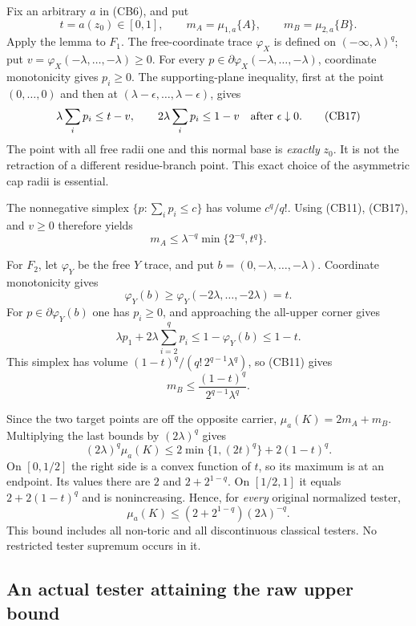 Fix an arbitrary $a$ in (CB6), and put
\[
           t=a(z_0)\in[0,1],\qquad
           m_A=\mu_{1,a}\{A\},\qquad m_B=\mu_{2,a}\{B\}.
 \tag{CB16}
\]
Apply the lemma to $F_1$. The free-coordinate trace
$\varphi_X$ is defined on $(-\infty,\lambda)^q$; put
$v=\varphi_X(-\lambda,\ldots,-\lambda)\ge0$.
For every $p\in\partial\varphi_X(-\lambda,\ldots,-\lambda)$,
coordinate monotonicity gives $p_i\ge0$. The supporting-plane
inequality, first at the point $(0,\ldots,0)$ and then at
$(\lambda-\epsilon,\ldots,\lambda-\epsilon)$, gives
\[
        \lambda\sum_i p_i\le t-v,\qquad
        2\lambda\sum_i p_i\le1-v
                        \quad\hbox{after }\epsilon\downarrow0.
 \tag{CB17}
\]
The point with all free radii one and this normal base is
\emph{exactly} $z_0$. It is not the retraction of a different
residue-branch point. This exact choice of the asymmetric cap
radii is essential.

The nonnegative simplex
$\{p:\sum_i p_i\le c\}$ has volume $c^q/q!$.
Using (CB11), (CB17), and $v\ge0$ therefore yields
\[
                  m_A\le
                 \lambda^{-q}\min\{2^{-q},t^q\}.
 \tag{CB18}
\]

For $F_2$, let $\varphi_Y$ be the free $Y$ trace, and put
$b=(0,-\lambda,\ldots,-\lambda)$.
Coordinate monotonicity gives
\[
       \varphi_Y(b)\ge
          \varphi_Y(-2\lambda,\ldots,-2\lambda)=t.
 \tag{CB19}
\]
For $p\in\partial\varphi_Y(b)$ one has $p_i\ge0$, and
approaching the all-upper corner gives
\[
       \lambda p_1+2\lambda\sum_{i=2}^q p_i
                           \le1-\varphi_Y(b)\le1-t.
 \tag{CB20}
\]
This simplex has volume
$(1-t)^q/(q!\,2^{q-1}\lambda^q)$, so (CB11) gives
\[
                    m_B\le
                    \frac{(1-t)^q}{2^{q-1}\lambda^q}.
 \tag{CB21}
\]

Since the two target points are off the opposite carrier,
$\mu_a(K)=2m_A+m_B$. Multiplying the last bounds by
$(2\lambda)^q$ gives
\[
       (2\lambda)^q\mu_a(K)
          \le2\min\{1,(2t)^q\}+2(1-t)^q.
 \tag{CB22}
\]
On $[0,1/2]$ the right side is a convex function of $t$,
so its maximum is at an endpoint. Its values there are
$2$ and $2+2^{1-q}$. On $[1/2,1]$ it equals
$2+2(1-t)^q$ and is nonincreasing. Hence, for
\emph{every} original normalized tester,
\[
                       \mu_a(K)\le
                           (2+2^{1-q})(2\lambda)^{-q}.
 \tag{CB23}
\]
This bound includes all non-toric and all discontinuous
classical testers. No restricted tester supremum occurs in it.

\subsection{An actual tester attaining the raw upper bound}

